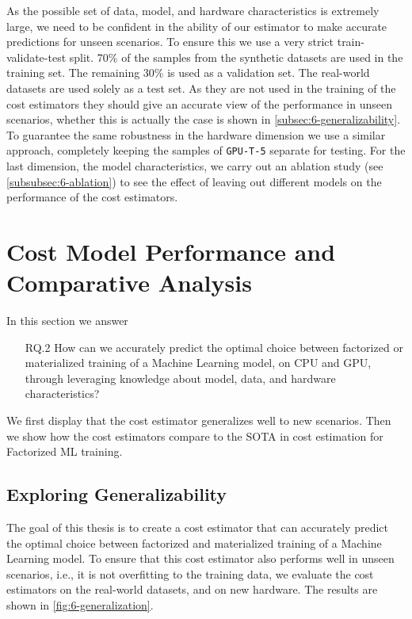 As the possible set of data, model, and hardware characteristics is extremely large, we need to be confident in the ability of our estimator to make accurate predictions for unseen scenarios. To ensure this we use a very strict train-validate-test split. 70\% of the samples from the synthetic datasets are used in the training set. The remaining 30\% is used as a validation set. The real-world datasets are used solely as a test set. As they are not used in the training of the cost estimators they should give an accurate view of the performance in unseen scenarios, whether this is actually the case is shown in \autoref{subsec:6-generalizability}. To guarantee the same robustness in the hardware dimension we use a similar approach, completely keeping the samples of \texttt{GPU-T-5} separate for testing. For the last dimension, the model characteristics, we carry out an ablation study (see \autoref{subsubsec:6-ablation}) to see the effect of leaving out different models on the performance of the cost estimators.



\section{Cost Model Performance and Comparative Analysis}
\label{sec:eval-model-evaluation}

In this section we answer
\begin{itemize}
    \item[RQ.2] How can we accurately predict the optimal choice between factorized or materialized training of a Machine Learning model, on CPU and GPU, through leveraging knowledge about model, data, and hardware characteristics?
\end{itemize}

We first display that the cost estimator generalizes well to new scenarios. Then we show how the cost estimators compare to the SOTA in cost estimation for Factorized ML training.

\subsection{Exploring Generalizability}
\label{subsec:6-generalizability}
The goal of this thesis is to create a cost estimator that can accurately predict the optimal choice between factorized and materialized training of a Machine Learning model. To ensure that this cost estimator also performs well in unseen scenarios, i.e., it is not overfitting to the training data, we evaluate the cost estimators on the real-world datasets, and on new hardware. The results are shown in \autoref{fig:6-generalization}.

